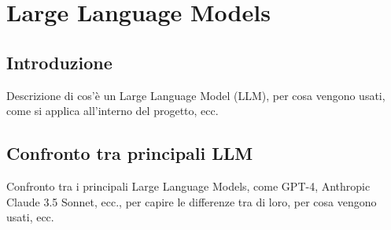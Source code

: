 \section{Large Language Models}
\label{sez:llm}

\subsection{Introduzione}
\label{subsec:llm-introduzione}

Descrizione di cos'è un Large Language Model (LLM), per cosa vengono usati, come si applica all'interno del progetto, ecc.

\subsection{Confronto tra principali LLM}
\label{subsec:llm-confronto}

Confronto tra i principali Large Language Models, come GPT-4, Anthropic Claude 3.5 Sonnet, ecc., per capire le differenze tra di loro, per cosa vengono usati, ecc.